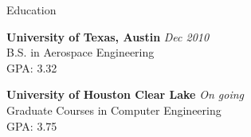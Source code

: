 \documentclass{resume} %
\begin{document}

\begin{rSection}{Education}

{\bf University of Texas, Austin} \hfill {\em Dec 2010} \\ 
B.S. in Aerospace Engineering \\
GPA: 3.32

{\bf University of Houston Clear Lake} \hfill {\em On going} \\ 
Graduate Courses in Computer Engineering \\
GPA: 3.75

\end{rSection}

\end{document}
